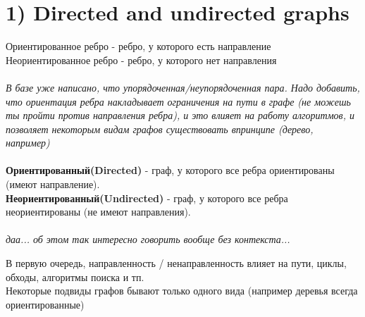 \documentclass[../TM3-UltraDoc.tex]{subfiles}
\begin{document}
	\section*{1) Directed and undirected graphs}
	Ориентированное ребро - ребро, у которого есть направление\\
	Неориентированное ребро - ребро, у которого нет направления\\
	\\
	\noindent
	\textit{В базе уже написано, что упорядоченная/неупорядоченная пара. Надо добавить, что ориентация ребра накладывает ограничения на пути в графе (не можешь ты пройти против направления ребра), и это влияет на работу алгоритмов, и позволяет некоторым видам графов существовать впринципе (дерево, например)}\\
	\\
	\noindent
	\textbf{Ориентированный(Directed)} - граф, у которого все ребра ориентированы (имеют направление).\\
	\textbf{Неориентированный(Undirected)} - граф, у которого все ребра неориентированы (не имеют направления).\\
	\\
	\textit{даа... об этом так интересно говорить вообще без контекста...}
	\\
	\small
	\begin{tcolorbox}[colframe=gray!50!black, left=5pt, right=5pt, top=5pt, bottom=5pt, boxrule=1pt, title=\textbf{Так что контекста навалю я}, colback=gray!10!white]
		В первую очередь, направленность / ненаправленность влияет на пути, циклы, обходы, алгоритмы поиска и тп.\\
		Некоторые подвиды графов бывают только одного вида (например деревья всегда ориентированные)
	\end{tcolorbox}
	\normalsize
		
\end{document}
